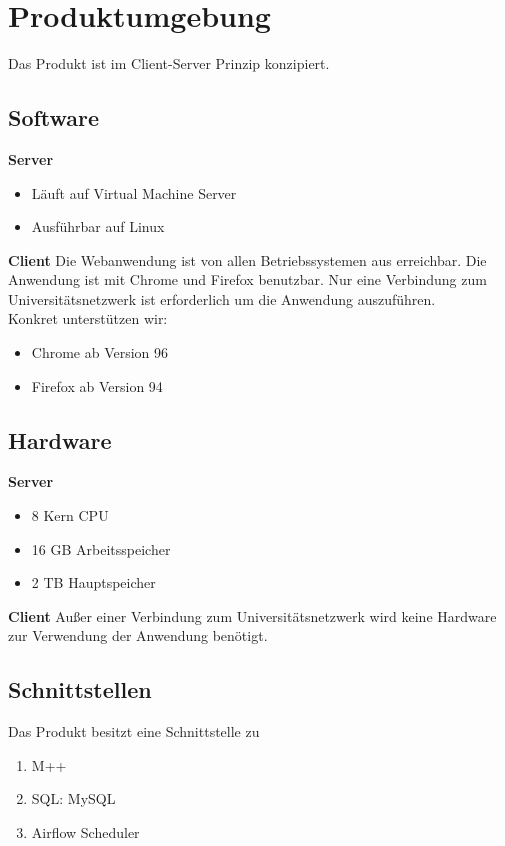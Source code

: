 \chapter{Produktumgebung}
Das Produkt ist im \gls{Client-Server} Prinzip konzipiert.

\section{Software}
\textbf{Server}
\begin{itemize}
    \item Läuft auf \gls{Virtual Machine} Server
    \item Ausführbar auf Linux
\end{itemize}
\textbf{Client} Die Webanwendung ist von allen Betriebssystemen aus erreichbar. Die Anwendung ist mit Chrome und Firefox benutzbar. Nur eine Verbindung zum Universitätsnetzwerk ist erforderlich um die Anwendung auszuführen. \\[0.1in] Konkret unterstützen wir:
\begin{itemize}
    \setlength\itemsep{-1em}
    \item Chrome ab Version 96
    \item Firefox ab Version 94 %
\end{itemize}
\section{Hardware}
\textbf{Server}
\begin{itemize}
    \item 8 Kern CPU
    \item 16 GB Arbeitsspeicher
    \item 2 TB Hauptspeicher
\end{itemize}

\textbf{Client}
Außer einer Verbindung zum Universitätsnetzwerk wird keine Hardware zur Verwendung der Anwendung benötigt. 

\section{Schnittstellen}
\renewcommand{\labelenumi}{/S\arabic{enumi}0/}
Das Produkt besitzt eine Schnittstelle zu
\begin{enumerate}
    \setlength\itemsep{-1em}
    \item \gls{M++}
    \item \gls{SQL}: MySQL
    \item Airflow Scheduler
\end{enumerate}
